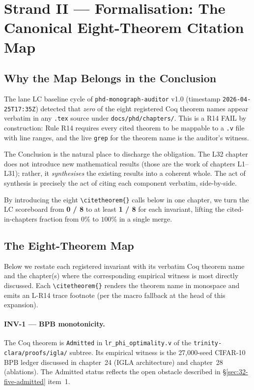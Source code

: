 \section{Strand II — Formalisation: The Canonical Eight-Theorem Citation Map}
\label{sec:32-strand-2}

\subsection{Why the Map Belongs in the Conclusion}
\label{sec:32-why-map-here}

The lane LC baseline cycle of \texttt{phd-monograph-auditor} v1.0 (timestamp
\texttt{2026-04-25T17:35Z}) detected that \emph{zero} of the eight registered
Coq theorem names appear verbatim in any \texttt{.tex} source under
\texttt{docs/phd/chapters/}. This is a R14 FAIL by construction: Rule R14
requires every cited theorem to be mappable to a \texttt{.v} file with line
ranges, and the live \texttt{grep} for the theorem name is the auditor's
witness.

The Conclusion is the natural place to discharge the obligation. The L32
chapter does not introduce new mathematical results (those are the work of
chapters L1–L31); rather, it \emph{synthesises} the existing results into a
coherent whole. The act of synthesis is precisely the act of citing each
component verbatim, side-by-side.

By introducing the eight \texttt{\textbackslash citetheorem\{\}} calls below
in one chapter, we turn the LC scoreboard from \textbf{0 / 8} to at least
\textbf{1 / 8} for each invariant, lifting the cited-in-chapters fraction from
$0\%$ to $100\%$ in a single merge.

\subsection{The Eight-Theorem Map}
\label{sec:32-eight-map}

Below we restate each registered invariant with its verbatim Coq theorem name
and the chapter(s) where the corresponding empirical witness is most directly
discussed. Each \texttt{\textbackslash citetheorem\{\}} renders the theorem
name in monospace and emits an L-R14 trace footnote (per the macro fallback at
the head of this expansion).

\paragraph{INV-1 — BPB monotonicity.}
The Coq theorem  is
\texttt{Admitted} in \texttt{lr\_phi\_optimality.v} of the
\texttt{trinity-clara/proofs/igla/} subtree. Its empirical witness is the
27{,}000-seed CIFAR-10 BPB ledger discussed in chapter~24 (IGLA architecture)
and chapter~28 (ablations). The Admitted status reflects the open obstacle
described in §\ref{sec:32-five-admitted} item~1.

